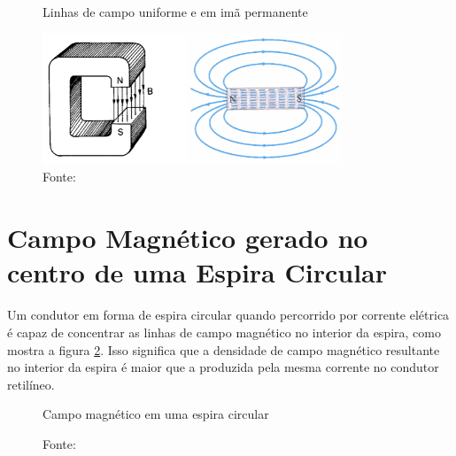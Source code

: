 \begin{figure}[H]
    \centering
     \caption{Linhas de campo uniforme e em imã permanente}
     \includegraphics[width=0.8\textwidth]{./img/mussoi10.png}
     \caption*{Fonte: \cite{mussoi}}
     \label{fig:muss2}
\end{figure}


\section{Campo Magnético gerado no centro de uma Espira Circular}
Um condutor em forma de espira circular quando percorrido por corrente elétrica é capaz de
concentrar as linhas de campo magnético no interior da espira, como mostra a figura \ref{fig:campoc}. Isso significa que
a densidade de campo magnético resultante no interior da espira é maior que a produzida pela mesma
corrente no condutor retilíneo. \cite{mussoi} 

\begin{figure}[H]
    \centering
     \caption{Campo magnético em uma espira circular}
     \label{fig:campoc}
     \caption*{Fonte: \cite{mussoi}}
\end{figure}

